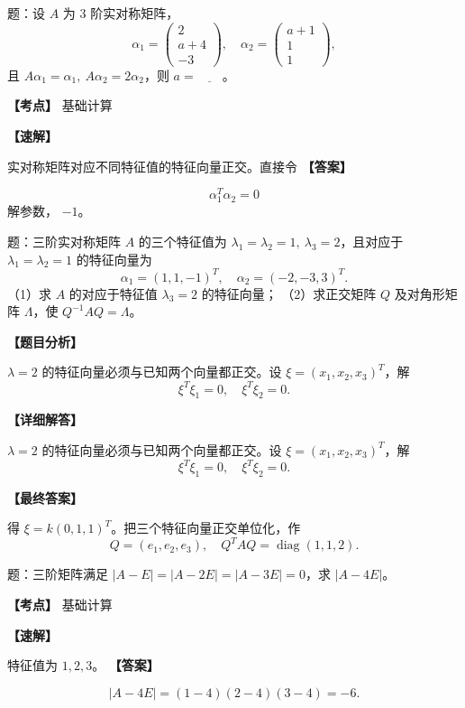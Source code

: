 ﻿\documentclass[11pt,a4paper,UTF8]{ctexart}
\begin{document}
\begin{answerbox}[2020--2021 填空 5]
题：设 $A$ 为 $3$ 阶实对称矩阵，
\[
\alpha_1=\begin{pmatrix}2\\a+4\\-3\end{pmatrix},\quad
\alpha_2=\begin{pmatrix}a+1\\1\\1\end{pmatrix},
\]
且 $A\alpha_1=\alpha_1,\ A\alpha_2=2\alpha_2$，则 $a=\underline{\qquad}$。

\textbf{【考点】} 基础计算

\textbf{【速解】}

实对称矩阵对应不同特征值的特征向量正交。直接令
\textbf{【答案】}

\[\alpha_1^T\alpha_2=0\]
解参数， $-1$。
\end{answerbox}
\begin{answerbox}
题：三阶实对称矩阵 $A$ 的三个特征值为 $\lambda_1=\lambda_2=1,\ \lambda_3=2$，且对应于 $\lambda_1=\lambda_2=1$ 的特征向量为
\[
\alpha_1=(1,1,-1)^T,\quad \alpha_2=(-2,-3,3)^T.
\]
（1）求 $A$ 的对应于特征值 $\lambda_3=2$ 的特征向量；
（2）求正交矩阵 $Q$ 及对角形矩阵 $\Lambda$，使 $Q^{-1}AQ=\Lambda$。

\textbf{【题目分析】}

$\lambda=2$ 的特征向量必须与已知两个向量都正交。设 $\xi=(x_1,x_2,x_3)^T$，解
\[\xi^T\xi_1=0,\quad \xi^T\xi_2=0.\]

\textbf{【详细解答】}

$\lambda=2$ 的特征向量必须与已知两个向量都正交。设 $\xi=(x_1,x_2,x_3)^T$，解
\[\xi^T\xi_1=0,\quad \xi^T\xi_2=0.\]

\textbf{【最终答案】}

得 $\xi=k(0,1,1)^T$。把三个特征向量正交单位化，作
\[Q=(e_1,e_2,e_3),\quad Q^TAQ=\operatorname{diag}(1,1,2).\]
\end{answerbox}
\begin{answerbox}[2022--2023 填空 5]
题：三阶矩阵满足 $|A-E|=|A-2E|=|A-3E|=0$，求 $|A-4E|$。

\textbf{【考点】} 基础计算

\textbf{【速解】}

特征值为 $1,2,3$。
\textbf{【答案】}

\[|A-4E|=(1-4)(2-4)(3-4)=-6.\]
\end{answerbox}
\end{document}
